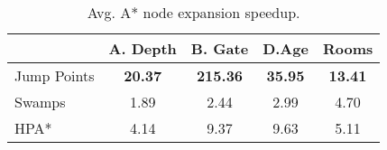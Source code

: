 \begin{table}[tb]
\begin{center}
\begin{tabular}{lcccc}
  \hline
 & A. Depth & B. Gate & D.Age & Rooms \\ 
  \hline
Jump Points & \textbf{20.37} & \textbf{215.36} & \textbf{35.95} & \textbf{13.41} \\ 
  Swamps & 1.89 & 2.44 & 2.99 & 4.70 \\ 
  HPA* & 4.14 & 9.37 & 9.63 & 5.11 \\ 
   \hline
\end{tabular}
\end{center}
\caption{Avg. A* node expansion speedup.} 
\label{table:nodes}
\end{table}

